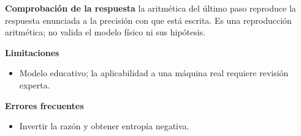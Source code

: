 \documentclass[10pt,openany]{book}
\begin{document}
\begin{tcolorbox}[title={Problema resuelto 3}, studiumworked, breakable]
\noindent\textbf{Comprobación de la respuesta} la aritmética del último paso reproduce la respuesta enunciada a la precisión con que está escrita. Es una reproducción aritmética; no valida el modelo físico ni sus hipótesis.

\noindent\textbf{Limitaciones}
\begin{itemize}
\item Modelo educativo; la aplicabilidad a una máquina real requiere revisión experta.
\end{itemize}

\noindent\textbf{Errores frecuentes}
\begin{itemize}
\item Invertir la razón y obtener entropía negativa.
\end{itemize}
\end{tcolorbox}
\end{document}
